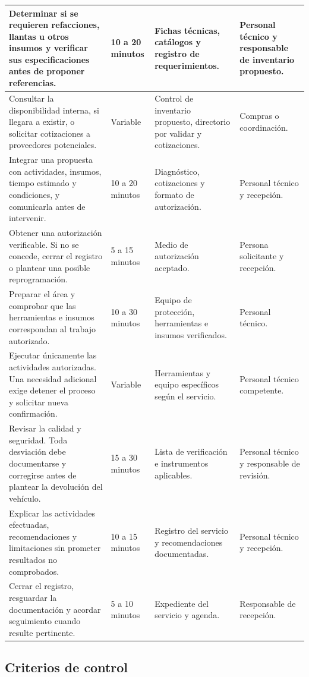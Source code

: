 \documentclass[12pt,letterpaper,oneside]{article}
\begin{document}
\begin{longtable}{|p{}|p{}|p{}|p{}|}
\hline
Determinar si se requieren refacciones, llantas u otros insumos y verificar sus especificaciones antes de proponer referencias. & 10 a 20 minutos & Fichas técnicas, catálogos y registro de requerimientos. & Personal técnico y responsable de inventario propuesto. \\
\hline
Consultar la disponibilidad interna, si llegara a existir, o solicitar cotizaciones a proveedores potenciales. & Variable & Control de inventario propuesto, directorio por validar y cotizaciones. & Compras o coordinación. \\
\hline
Integrar una propuesta con actividades, insumos, tiempo estimado y condiciones, y comunicarla antes de intervenir. & 10 a 20 minutos & Diagnóstico, cotizaciones y formato de autorización. & Personal técnico y recepción. \\
\hline
Obtener una autorización verificable. Si no se concede, cerrar el registro o plantear una posible reprogramación. & 5 a 15 minutos & Medio de autorización aceptado. & Persona solicitante y recepción. \\
\hline
Preparar el área y comprobar que las herramientas e insumos correspondan al trabajo autorizado. & 10 a 30 minutos & Equipo de protección, herramientas e insumos verificados. & Personal técnico. \\
\hline
Ejecutar únicamente las actividades autorizadas. Una necesidad adicional exige detener el proceso y solicitar nueva confirmación. & Variable & Herramientas y equipo específicos según el servicio. & Personal técnico competente. \\
\hline
Revisar la calidad y seguridad. Toda desviación debe documentarse y corregirse antes de plantear la devolución del vehículo. & 15 a 30 minutos & Lista de verificación e instrumentos aplicables. & Personal técnico y responsable de revisión. \\
\hline
Explicar las actividades efectuadas, recomendaciones y limitaciones sin prometer resultados no comprobados. & 10 a 15 minutos & Registro del servicio y recomendaciones documentadas. & Personal técnico y recepción. \\
\hline
Cerrar el registro, resguardar la documentación y acordar seguimiento cuando resulte pertinente. & 5 a 10 minutos & Expediente del servicio y agenda. & Responsable de recepción. \\
\hline
\end{longtable}

\subsection{Criterios de control}
\end{document}
